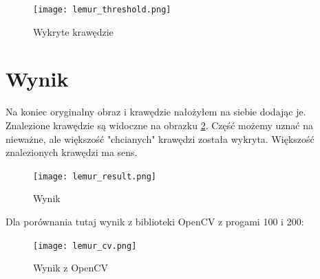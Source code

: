 \documentclass[a4paper]{article}
\begin{document}
\begin{figure}[H]
    \centering
    \texttt{[image: lemur\_threshold.png]}
    \caption{Wykryte krawędzie}
    \label{fig:lemur_threshold}
\end{figure}

\section{Wynik}

Na koniec oryginalny obraz i krawędzie nałożyłem na siebie dodając je.
Znalezione krawędzie są widoczne na obrazku \ref{fig:lemur_result}.
Część możemy uznać na nieważne, ale większość "chcianych" krawędzi
została wykryta. Większość znalezionych krawędzi ma sens.

\begin{figure}[H]
    \centering
    \texttt{[image: lemur\_result.png]}
    \caption{Wynik}
    \label{fig:lemur_result}
\end{figure}

Dla porównania tutaj wynik z biblioteki OpenCV z progami 100 i 200:

\begin{figure}[H]
    \centering
    \texttt{[image: lemur\_cv.png]}
    \caption{Wynik z OpenCV}
    \label{fig:lemur_cv}
\end{figure}
\end{document}
